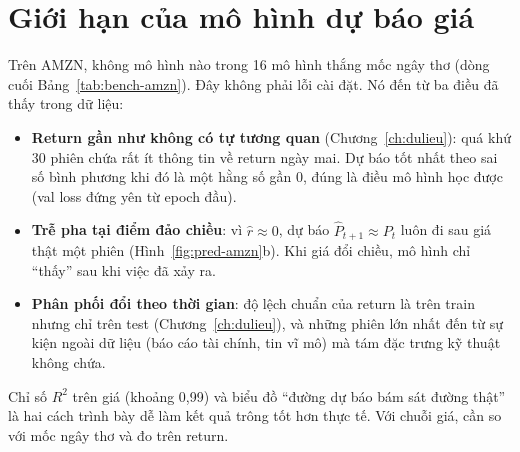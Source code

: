 \section{Giới hạn của mô hình dự báo giá}

Trên AMZN, không mô hình nào trong 16 mô hình thắng mốc ngây thơ (dòng cuối Bảng~\ref{tab:bench-amzn}). Đây không phải
lỗi cài đặt. Nó đến từ ba điều đã thấy trong dữ liệu:

\begin{itemize}
  \item \textbf{Return gần như không có tự tương quan} (Chương~\ref{ch:dulieu}): quá khứ 30 phiên chứa rất ít thông tin
        về return ngày mai. Dự báo tốt nhất theo sai số bình phương khi đó là một hằng số gần 0, đúng là điều mô hình
        học được (val loss đứng yên từ epoch đầu).
  \item \textbf{Trễ pha tại điểm đảo chiều}: vì $\hat r \approx 0$, dự báo $\hat P_{t+1} \approx P_t$ luôn đi sau giá thật
        một phiên (Hình~\ref{fig:pred-amzn}b). Khi giá đổi chiều, mô hình chỉ ``thấy'' sau khi việc đã xảy ra.
  \item \textbf{Phân phối đổi theo thời gian}: độ lệch chuẩn của return là  trên train nhưng chỉ
         trên test (Chương~\ref{ch:dulieu}), và những phiên lớn nhất đến từ sự kiện ngoài dữ liệu (báo cáo tài chính, tin vĩ mô) mà
        tám đặc trưng kỹ thuật không chứa.
\end{itemize}

Chỉ số $R^2$ trên giá (khoảng 0,99) và biểu đồ ``đường dự báo bám sát đường thật'' là hai cách trình bày dễ làm kết quả
trông tốt hơn thực tế. Với chuỗi giá, cần so với mốc ngây thơ và đo trên return.
